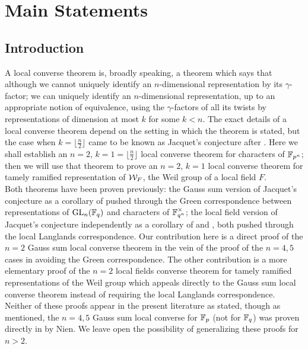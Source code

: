 \chapter{Main Statements}	%

\section{Introduction}

A local converse theorem is, broadly speaking, a theorem which says that although we cannot uniquely identify an $n$-dimensional representation by its $\gamma$-factor; we can uniquely identify an $n$-dimensional representation, up to an appropriate notion of equivalence, using the $\gamma$-factors of all its twists by representations of dimension at most $k$ for some $k < n$.
The exact details of a local converse theorem depend on the setting in which the theorem is stated, but the case when $k = \lfloor \frac{n}{2} \rfloor$ came to be known as Jacquet's conjecture after \cite{Jacquet1983}.
Here we shall establish an $n = 2$, $k=1 = \lfloor \frac{n}{2}\rfloor$ local converse theorem for characters of $\mathbb{F}_{p^n}$; then we will use that theorem to prove an $n=2$, $k=1$ local converse theorem for tamely ramified representation of $\mathcal{W}_F$, the Weil group of a local field $F$.
\\

Both theorems have been proven previously: the Gauss sum version of Jacquet's conjecture as a corollary of  \cite{Nien2014} pushed through the Green correspondence between representations of $\textrm{GL}_n(\mathbb{F}_q)$ and characters of $\mathbb{F}_{q^n}^\times$; the local field version of Jacquet's conjecture independently as a corollary of \cite{Jacquet2017} and \cite{Chai2016}, both pushed through the local Langlands correspondence.
Our contribution here is a direct proof of the $n=2$ Gauss sum local converse theorem in the vein of the proof of the $n = 4, 5$ cases in  \cite{Nien2018} avoiding the Green correspondence.
The other contribution is a more elementary proof of the $n=2$ local fields converse theorem for tamely ramified representations of the Weil group which appeals directly to the Gauss sum local converse theorem instead of requiring the local Langlands correspondence.
Neither of these proofs appear in the present literature as stated, though as mentioned, the $n=4,5$ Gauss sum local converse for $\mathbb{F}_p$ (not for $\mathbb{F}_q$) was proven directly in \cite{Nien2018} by Nien.
We leave open the possibility of generalizing these proofs for $n > 2$.
\\

